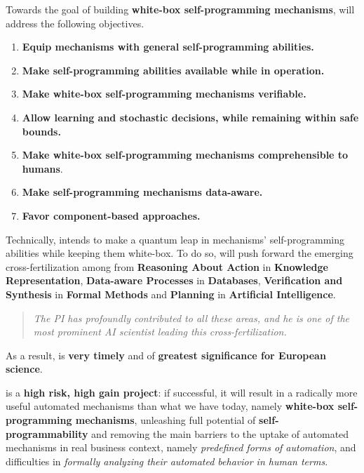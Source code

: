 Towards the goal of building \textbf{white-box self-programming mechanisms}, \project will address the following objectives. %
\begin{enumerate}

\item \textbf{Equip mechanisms with general self-programming abilities.}

\item \textbf{Make self-programming abilities available while in operation.} 

\item \textbf{Make white-box self-programming mechanisms verifiable.}

\item 
\textbf{Allow learning and stochastic decisions, while remaining within safe bounds.}

\item \textbf{Make white-box self-programming mechanisms comprehensible to
    humans}. 
\item \textbf{Make self-programming mechanisms data-aware.}

\item \textbf{Favor component-based approaches.}  
\end{enumerate}




Technically, \project intends to make a quantum leap in
mechanisms' self-programming abilities while keeping them white-box. To do so,  \project will push forward the emerging cross-fertilization
among from \textbf{Reasoning About Action} in \textbf{Knowledge
  Representation}, \textbf{Data-aware Processes} in \textbf{Databases}, \textbf{Verification and Synthesis} in
\textbf{Formal Methods} and \textbf{Planning} in \textbf{Artificial
  Intelligence}. 

\begin{quote}{\it
The PI has profoundly contributed to all these areas, and he is %
one of the most prominent AI scientist leading this cross-fertilization.}
\end{quote}


As a result, \project is \textbf{very timely} and of \textbf{greatest significance for European science}.

\project is a \textbf{high risk, high gain project}: if successful, it
will result in a radically more useful automated mechanisms than what
we have today, namely \textbf{white-box self-programming mechanisms},
unleashing full potential of \textbf{self-programmability} and
removing the main barriers to the uptake of automated mechanisms in
real business context, namely \textit{predefined forms of automation}, and
difficulties in \textit{formally analyzing their automated behavior in human terms}.

